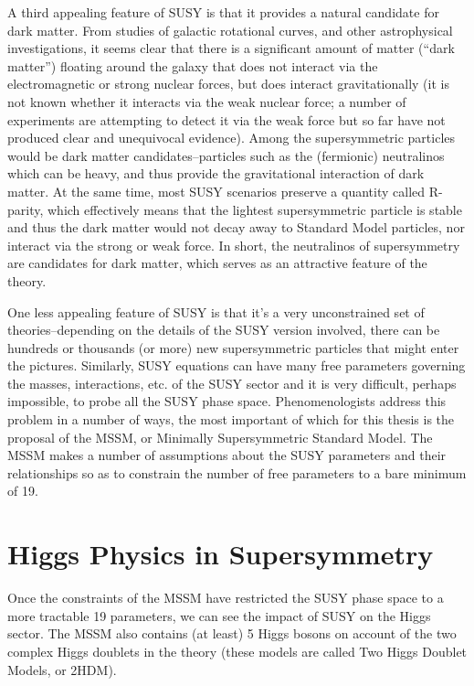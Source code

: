 A third appealing feature of SUSY is that it provides a natural candidate for dark matter.  From studies of galactic rotational curves, and other astrophysical investigations, it seems clear that there is a significant amount of matter (``dark matter'') floating around the galaxy that does not interact via the electromagnetic or strong nuclear forces, but does interact gravitationally (it is not known whether it interacts via the weak nuclear force; a number of experiments are attempting to detect it via the weak force but so far have not produced clear and unequivocal evidence).  Among the supersymmetric particles would be dark matter candidates--particles such as the (fermionic) neutralinos which can be heavy, and thus provide the gravitational interaction of dark matter.  At the same time, most SUSY scenarios preserve a quantity called R-parity, which effectively means that the lightest supersymmetric particle is stable and thus the dark matter would not decay away to Standard Model particles, nor interact via the strong or weak force.  In short, the neutralinos of supersymmetry are candidates for dark matter, which serves as an attractive feature of the theory. 


One less appealing feature of SUSY is that it's a very unconstrained set of theories--depending on the details of the SUSY version involved, there can be hundreds or thousands (or more) new supersymmetric particles that might enter the pictures.  Similarly, SUSY equations can have many free parameters governing the masses, interactions, etc. of the SUSY sector and it is very difficult, perhaps impossible, to probe all the SUSY phase space.  Phenomenologists address this problem in a number of ways, the most important of which for this thesis is the proposal of the MSSM, or Minimally Supersymmetric Standard Model.  The MSSM makes a number of assumptions about the SUSY parameters and their relationships so as to constrain the number of free parameters to a bare minimum of 19.  

\section{Higgs Physics in Supersymmetry}
\label{sec:SUSY_Higgs}
Once the constraints of the MSSM have restricted the SUSY phase space to a more tractable 19 parameters, we can see the impact of SUSY on the Higgs sector.  The MSSM also contains (at least) 5 Higgs bosons on account of the two complex Higgs doublets in the theory (these models are called Two Higgs Doublet Models, or 2HDM).  

